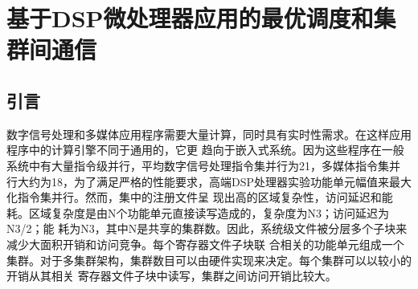 
\chapter{基于DSP微处理器应用的最优调度和集群间通信}

\section{引言}
数字信号处理和多媒体应用程序需要大量计算，同时具有实时性需求。在这样应用程序中的计算引擎不同于通用的，它更
趋向于嵌入式系统。因为这些程序在一般系统中有大量指令级并行，平均数字信号处理指令集并行为21，多媒体指令集并
行大约为18，为了满足严格的性能要求，高端DSP处理器实验功能单元幅值来最大化指令集并行。然而，集中的注册文件呈
现出高的区域复杂性，访问延迟和能耗。区域复杂度是由N个功能单元直接读写造成的，复杂度为N3；访问延迟为N3/2；能
耗为N3，其中N是共享的集群数。因此，系统级文件被分层多个子块来减少大面积开销和访问竞争。每个寄存器文件子块联
合相关的功能单元组成一个集群。对于多集群架构，集群数目可以由硬件实现来决定。每个集群可以以较小的开销从其相关
寄存器文件子块中读写，集群之间访问开销比较大。

